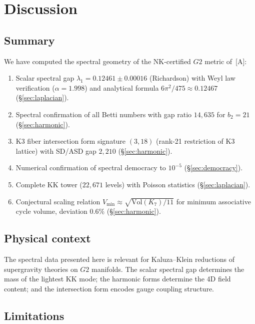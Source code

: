 \documentclass[11pt,a4paper]{article}
\newcommand{\Gtwo}{\mathrm{G}_2}
\def\Gtwo{G2}%
\begin{document}
\section{Discussion}\label{sec:discussion}

\subsection{Summary}

We have computed the spectral geometry of the NK-certified $\Gtwo$ metric of~[A]:
\begin{enumerate}
\item Scalar spectral gap $\lambda_1 = 0.12461 \pm 0.00016$ (Richardson) with Weyl law verification ($\alpha = 1.998$) and analytical formula $6\pi^2/475 \approx 0.12467$ (§\ref{sec:laplacian}).
\item Spectral confirmation of all Betti numbers with gap ratio $14{,}635$ for $b_2 = 21$ (§\ref{sec:harmonic}).
\item K3 fiber intersection form signature $(3, 18)$ (rank-21 restriction of K3 lattice) with SD/ASD gap $2{,}210$ (§\ref{sec:harmonic}).
\item Numerical confirmation of spectral democracy to $10^{-5}$ (§\ref{sec:democracy}).
\item Complete KK tower ($22{,}671$ levels) with Poisson statistics (§\ref{sec:laplacian}).
\item Conjectural scaling relation $V_{\min} \approx \sqrt{\mathrm{Vol}(K_7)/11}$ for minimum associative cycle volume, deviation $0.6\%$ (§\ref{sec:harmonic}).
\end{enumerate}

\subsection{Physical context}

The spectral data presented here is relevant for Kaluza--Klein reductions of supergravity theories on $\Gtwo$ manifolds. The scalar spectral gap determines the mass of the lightest KK mode; the harmonic forms determine the 4D field content; and the intersection form encodes gauge coupling structure.

\subsection{Limitations}
\end{document}
